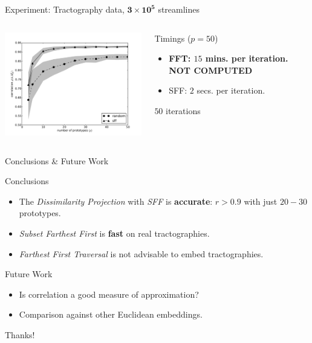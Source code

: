 \documentclass{beamer}
\begin{document}
\begin{frame}{Experiment: Tractography data, $\mathbf{3 \times 10^5}$
    streamlines}
  \begin{columns}
    \begin{column}{0.7\linewidth}
      \begin{center}
        \includegraphics[width=8.5cm]
        {tracks_300K_correlation_policies}
      \end{center}
    \end{column}
    \begin{column}{0.3\linewidth}
      \begin{block}{Timings ($p=50$)}
        \begin{itemize}
        \item \textbf{FFT: $15$ mins. per iteration. NOT COMPUTED}
        \item SFF: $2$ secs. per iteration.
        \end{itemize}
      \end{block}
      $50$ iterations
    \end{column}
  \end{columns}
\end{frame}

\begin{frame}{Conclusions \& Future Work}
  \begin{block}{Conclusions}
    \begin{itemize}
    \item The \emph{Dissimilarity Projection} with \emph{SFF} is
      \textbf{accurate}: $r>0.9$ with just $20-30$ prototypes.
    \item \emph{Subset Farthest First} is \textbf{fast} on real
      tractographies.
    \item \emph{Farthest First Traversal} is not advisable to embed
      tractographies.
    \end{itemize}
  \end{block}
  \begin{block}{Future Work}
    \begin{itemize}
    \item Is correlation a good measure of approximation?
    \item Comparison against other Euclidean embeddings.
    \end{itemize}
  \end{block}
\end{frame}

\begin{frame}
  \begin{center}
    \huge{Thanks!}
  \end{center}
\end{frame}


%   


\end{document}
